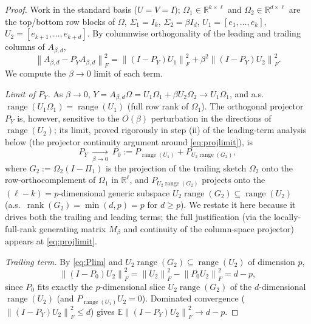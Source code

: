 \documentclass{amsart}
\theoremstyle{definition}
\DeclareMathOperator{\rank}{rank}
\DeclareMathOperator{\range}{range}
\newcommand{\R}{\mathbb{R}}
\newcommand{\Frob}[1]{\left\lVert #1\right\rVert_F}
\newcommand{\E}{\mathbb{E}}
\begin{document}
\begin{proof}
Work in the standard basis ($U=V=I$); $\Omega_1\in\R^{k\times\ell}$ and
$\Omega_2\in\R^{d\times\ell}$ are the top/bottom row blocks of $\Omega$,
$\Sigma_1=I_k$, $\Sigma_2=\beta I_d$, $U_1=[e_1,\dots,e_k]$,
$U_2=[e_{k+1},\dots,e_{k+d}]$. By columnwise orthogonality of the leading and
trailing columns of $A_{\beta,d}$,
\begin{equation}\label{eq:exactdecomp}
\Frob{A_{\beta,d}-P_YA_{\beta,d}}^2
=\Frob{(I-P_Y)U_1}^2+\beta^2\Frob{(I-P_Y)U_2}^2 .
\end{equation}
We compute the $\beta\to0$ limit of each term.

\emph{Limit of $P_Y$.} As $\beta\to0$, $Y=A_{\beta,d}\Omega=U_1\Omega_1+\beta U_2\Omega_2
\to U_1\Omega_1$, and a.s.\ $\range(U_1\Omega_1)=\range(U_1)$ (full row rank of
$\Omega_1$). The orthogonal projector $P_Y$ is, however, sensitive to the
$O(\beta)$ perturbation in the directions of $\range(U_2)$; its limit, proved
rigorously in step (ii) of the leading-term analysis below (the projector
continuity argument around \eqref{eq:projlimit}), is
\begin{equation}\label{eq:Plim}
P_Y\ \xrightarrow[\beta\to0]{}\ P_0:=P_{\range(U_1)}+P_{U_2\range(G_2)},
\end{equation}
where $G_2:=\Omega_2(I-\Pi_1)$ is the projection of the trailing sketch
$\Omega_2$ onto the row-orthocomplement of $\Omega_1$ in $\R^\ell$, and
$P_{U_2\range(G_2)}$ projects onto the $(\ell-k)=p$-dimensional generic subspace
$U_2\range(G_2)\subseteq\range(U_2)$ (a.s.\ $\rank(G_2)=\min(d,p)=p$ for $d\ge p$).
We restate it here because it drives both the trailing and leading terms;
the full justification (via the locally-full-rank generating matrix $M_\beta$ and
continuity of the column-space projector) appears at \eqref{eq:projlimit}.

\emph{Trailing term.} By \eqref{eq:Plim} and $U_2\range(G_2)\subseteq\range(U_2)$
of dimension $p$,
\[
\Frob{(I-P_0)U_2}^2=\Frob{U_2}^2-\Frob{P_0U_2}^2=d-p,
\]
since $P_0$ fits exactly the $p$-dimensional slice $U_2\range(G_2)$ of the
$d$-dimensional $\range(U_2)$ (and $P_{\range(U_1)}U_2=0$). Dominated convergence
($\Frob{(I-P_Y)U_2}^2\le d$) gives $\E\Frob{(I-P_Y)U_2}^2\to d-p$.


\end{proof}
\end{document}
